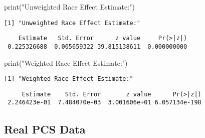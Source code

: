 \documentclass[
  letterpaper,
  DIV=11,
  numbers=noendperiod]{scrartcl}
\newenvironment{Shaded}{\begin{snugshade}}{\end{snugshade}}
\newcommand{\FunctionTok}[1]{\textcolor[rgb]{0.28,0.35,0.67}{#1}}
\newcommand{\NormalTok}[1]{\textcolor[rgb]{0.00,0.23,0.31}{#1}}
\newcommand{\SpecialCharTok}[1]{\textcolor[rgb]{0.37,0.37,0.37}{#1}}
\newcommand{\StringTok}[1]{\textcolor[rgb]{0.13,0.47,0.30}{#1}}
\begin{document}
\begin{Shaded}
\begin{Highlighting}[]
\FunctionTok{print}\NormalTok{(}\StringTok{"Unweighted Race Effect Estimate:"}\NormalTok{)}
\end{Highlighting}
\end{Shaded}

\begin{verbatim}
[1] "Unweighted Race Effect Estimate:"
\end{verbatim}

\begin{Shaded}
\end{Shaded}

\begin{verbatim}
    Estimate   Std. Error      z value     Pr(>|z|) 
 0.225326688  0.005659322 39.815138611  0.000000000 
\end{verbatim}

\begin{Shaded}
\begin{Highlighting}[]
\FunctionTok{print}\NormalTok{(}\StringTok{"Weighted Race Effect Estimate:"}\NormalTok{)}
\end{Highlighting}
\end{Shaded}

\begin{verbatim}
[1] "Weighted Race Effect Estimate:"
\end{verbatim}

\begin{Shaded}
\end{Shaded}

\begin{verbatim}
     Estimate    Std. Error       z value      Pr(>|z|) 
 2.246423e-01  7.484070e-03  3.001606e+01 6.057134e-198 
\end{verbatim}

\hypertarget{real-pcs-data}{%
\subsection{Real PCS Data}\label{real-pcs-data}}
\end{document}

